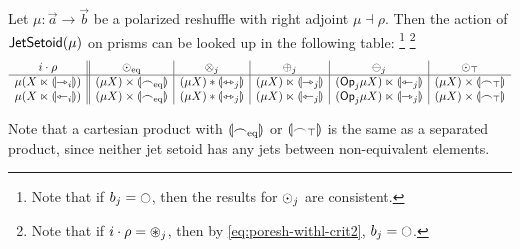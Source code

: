 \documentclass[a4paper]{memoir}
\begin{document}
\begin{proposition} \label{thm:poresh-jetsetoid-prism-commut}
	Let $\mu : \vec a \to \vec b$ be a polarized reshuffle with right adjoint $\mu \dashv \rho$.
	Then the action of $\mathsf{JetSetoid}(\mu)$ on prisms can be looked up in the following table:%
	\footnote{Note that if $b_j = \npolar$, then the results for ${\odot}_j$ are consistent.}%
	\footnote{Note that if $i \cdot \rho = {\oast}_j$, then by \cref{eq:poresh-withl-crit2}, $b_j = \npolar$.}
	\[
		\begin{array}{c || c | c | c | c | c}
			i \cdot \rho 
			& {\odot}_{\mathrm{eq}} 
			& {\otimes}_j
			& {\oplus}_j
			& {\ominus}_j 
			& {\odot}_\top 
			\\ \hline
			\mu(X \ltimes {\llparenthesis {\rightarrowtriangle}_i \rrparenthesis})
			& (\mu X) \times {\llparenthesis {\frown}_{{\mathrm{eq}}}\rrparenthesis}
			& (\mu X) * {\llparenthesis {\leftrightarrowtriangle}_j \rrparenthesis}
			& (\mu X) \ltimes {\llparenthesis {\rightarrowtriangle}_j \rrparenthesis}
			& ({\mathsf{Op}}_j\mu X) \ltimes {\llparenthesis {\leftarrowtriangle}_j \rrparenthesis}
			& (\mu X) \times {\llparenthesis {\frown}_\top\rrparenthesis}
			\\
			\mu(X \ltimes {\llparenthesis {\leftarrowtriangle}_i \rrparenthesis})
			& (\mu X) \times {\llparenthesis {\frown}_{{\mathrm{eq}}}\rrparenthesis}
			& (\mu X) * {\llparenthesis {\leftrightarrowtriangle}_j \rrparenthesis}
			& (\mu X) \ltimes {\llparenthesis {\leftarrowtriangle}_j \rrparenthesis}
			& ({\mathsf{Op}}_j\mu X) \ltimes {\llparenthesis {\rightarrowtriangle}_j \rrparenthesis}
			& (\mu X) \times {\llparenthesis {\frown}_\top\rrparenthesis}
		\end{array}
	\]
\end{proposition}
Note that a cartesian product with ${\llparenthesis {\frown}_{{\mathrm{eq}}} \rrparenthesis}$ or ${\llparenthesis {\frown}_\top \rrparenthesis}$ is the same as a separated product, since neither jet setoid has any jets between non-equivalent elements.
\end{document}
